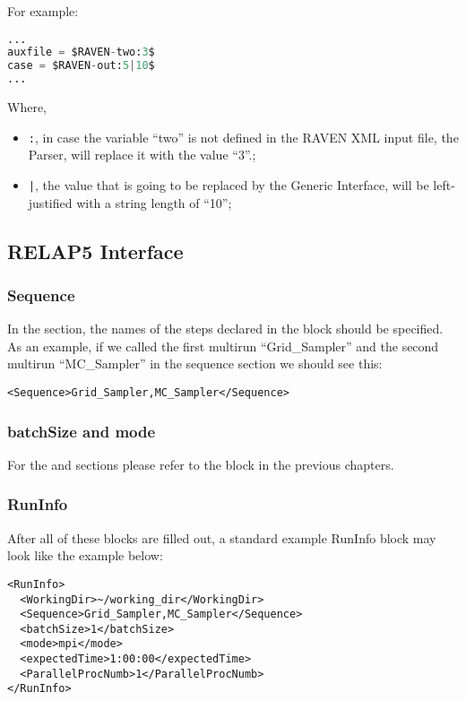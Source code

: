 For example:
\begin{lstlisting}[language=python]
...
auxfile = $RAVEN-two:3$
case = $RAVEN-out:5|10$
...
\end{lstlisting}
Where, 
\begin{itemize}
  \item  \texttt{:}, in case the variable ``two'' is not defined in the RAVEN XML input file, the Parser, will replace it with the value ``3''.;
  \item  \texttt{|}, the value that is going to be replaced by the Generic Interface, will be left- justified with a string length of ``10'';
\end{itemize}

\subsection{RELAP5 Interface}

\subsubsection{Sequence}
In the  section, the names of the steps declared in the
 block should be specified.
%
As an example, if we called the first multirun ``Grid\_Sampler'' and the second
multirun ``MC\_Sampler'' in the sequence section we should see this:
\begin{lstlisting}[style=XML]
<Sequence>Grid_Sampler,MC_Sampler</Sequence>
\end{lstlisting}

\subsubsection{batchSize and mode}
For the  and  sections please refer to the
 block in the previous chapters.
%
\subsubsection{RunInfo}
After all of these blocks are filled out, a standard example RunInfo block may
look like the example below:
\begin{lstlisting}[style=XML]
<RunInfo>
  <WorkingDir>~/working_dir</WorkingDir>
  <Sequence>Grid_Sampler,MC_Sampler</Sequence>
  <batchSize>1</batchSize>
  <mode>mpi</mode>
  <expectedTime>1:00:00</expectedTime>
  <ParallelProcNumb>1</ParallelProcNumb>
</RunInfo>
\end{lstlisting}
